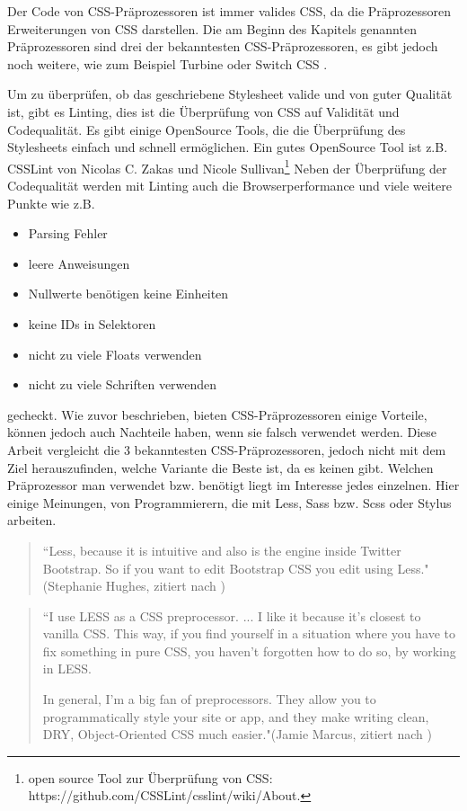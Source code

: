 Der Code von CSS-Präprozessoren ist immer valides CSS, da die Präprozessoren Erweiterungen von CSS darstellen. Die am Beginn des Kapitels genannten Präprozessoren sind drei der bekanntesten CSS-Präprozessoren, es gibt jedoch noch weitere, wie zum Beispiel Turbine oder Switch CSS \autocite[]{Jung.2010}.

Um zu überprüfen, ob das geschriebene Stylesheet valide und von guter Qualität ist, gibt es Linting, dies ist die Überprüfung von CSS auf Validität und Codequalität. Es gibt einige OpenSource Tools, die die Überprüfung des Stylesheets einfach und schnell ermöglichen. Ein gutes OpenSource Tool ist z.B. CSSLint von Nicolas C. Zakas und Nicole Sullivan\footnote[2]{open source Tool zur Überprüfung von CSS: https://github.com/CSSLint/csslint/wiki/About.}\newline
Neben der Überprüfung der Codequalität werden mit Linting auch die Browserperformance und viele weitere Punkte wie z.B.
\begin{itemize}
  \item Parsing Fehler
  \item leere Anweisungen
  \item Nullwerte benötigen keine Einheiten
  \item keine IDs in Selektoren
  \item nicht zu viele Floats verwenden
  \item nicht zu viele Schriften verwenden
\end{itemize} 
gecheckt. \newline\newline
Wie zuvor beschrieben, bieten CSS-Präprozessoren einige Vorteile, können jedoch auch Nachteile haben,  wenn sie falsch verwendet werden. Diese Arbeit vergleicht die 3 bekanntesten CSS-Präprozessoren, jedoch nicht mit dem Ziel herauszufinden, welche Variante die Beste ist, da es keinen \glqq{} gibt.\newline
Welchen Präprozessor man verwendet bzw. benötigt liegt im Interesse jedes einzelnen. Hier einige Meinungen, von Programmierern, die mit Less, Sass bzw. Scss oder Stylus arbeiten. 
\begin{quote}
``Less, because it is intuitive and also is the engine inside Twitter Bootstrap. So if you want to edit Bootstrap CSS you edit using Less."(Stephanie Hughes, zitiert nach \cite[]{psdtowp.2014})
\end{quote} 
\begin{quote}
``I use LESS as a CSS preprocessor. ... I like it because it's closest to vanilla CSS. This way, if you find yourself in a situation where you have to fix something in pure CSS, you haven't forgotten how to do so, by working in LESS.

In general, I'm a big fan of preprocessors. They allow you to programmatically style your site or app, and they make writing clean, DRY, Object-Oriented CSS much easier."(Jamie Marcus, zitiert nach \cite[]{psdtowp.2014})
\end{quote} 
